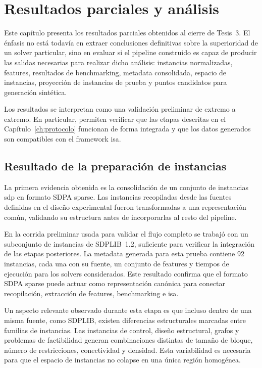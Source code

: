 \chapter{Resultados parciales y análisis}
\label{ch:resultados}

Este capítulo presenta los resultados parciales obtenidos al cierre de Tesis~3.
El énfasis no está todavía en extraer conclusiones definitivas sobre la superioridad
de un solver particular, sino en evaluar si el pipeline construido es capaz de
producir las salidas necesarias para realizar dicho análisis: instancias
normalizadas, features, resultados de benchmarking, metadata consolidada, espacio de
instancias, proyección de instancias de prueba y puntos candidatos para generación
sintética.

Los resultados se interpretan como una validación preliminar de extremo a extremo.
En particular, permiten verificar que las etapas descritas en el
Capítulo~\ref{ch:protocolo} funcionan de forma integrada y que los datos generados
son compatibles con el framework \acrshort{isa}.

\section{Resultado de la preparación de instancias}
\label{sec:resultados_instancias}

La primera evidencia obtenida es la consolidación de un conjunto de instancias
\acrshort{sdp} en formato SDPA sparse.
Las instancias recopiladas desde las fuentes definidas en el diseño experimental
fueron transformadas a una representación común, validando su estructura antes de
incorporarlas al resto del pipeline.

En la corrida preliminar usada para validar el flujo completo se trabajó con un
subconjunto de instancias de SDPLIB~1.2, suficiente para verificar la integración de
las etapas posteriores.
La metadata generada para esta prueba contiene 92 instancias, cada una con su fuente,
un conjunto de features y tiempos de ejecución para los solvers
considerados.
Este resultado confirma que el formato SDPA sparse puede actuar como representación
canónica para conectar recopilación, extracción de features, benchmarking e
\acrshort{isa}.

Un aspecto relevante observado durante esta etapa es que incluso dentro de una misma
fuente, como SDPLIB, existen diferencias estructurales marcadas entre familias de
instancias.
Las instancias de control, diseño estructural, grafos y problemas de factibilidad
generan combinaciones distintas de tamaño de bloque, número de restricciones,
conectividad y densidad.
Esta variabilidad es necesaria para que el espacio de instancias no colapse en una
única región homogénea.

